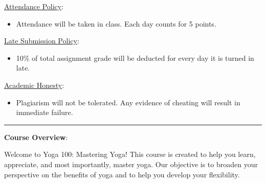 \documentclass{article}
\begin{document}
\begin{flushleft}
\vspace{0.1cm}

\underline{Attendance Policy}: 

\vspace{0.1cm}
\begin{itemize}[noitemsep,nolistsep]
    \item Attendance will be taken in class. Each day counts for 5 points.
\end{itemize}

\vspace{0.1cm}

\underline{Late Submission Policy}:
\begin{itemize}[noitemsep,nolistsep]
    \item 10\% of total assignment grade will be deducted for every day it is turned in late.
\end{itemize}

\vspace{0.1cm}

\underline{Academic Honesty}:

\vspace{0.1cm}
\begin{itemize}[noitemsep,nolistsep]
    \item Plagiarism will not be tolerated. Any evidence of cheating will result in immediate failure.
\end{itemize}


\noindent\rule[0.5ex]{\linewidth}{1pt}


\Large

\textbf{Course Overview}:



\large

Welcome to Yoga 100: Mastering Yoga! This course is created to help you learn, appreciate, and most importantly, master yoga. Our objective is to broaden your perspective on the benefits of yoga and to help you develop your flexibility.






\end{flushleft}
\end{document}
